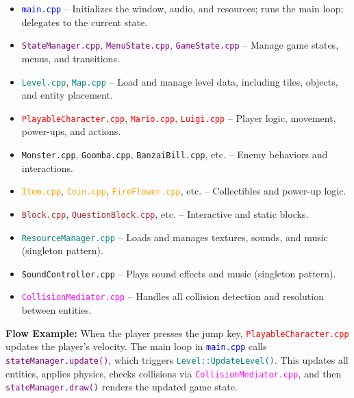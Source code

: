 \begin{flushleft}
\begin{itemize}
    \item \texttt{\textcolor{blue}{main.cpp}} – Initializes the window, audio, and resources; runs the main loop; delegates to the current state.
    \item \texttt{\textcolor{purple}{StateManager.cpp}}, \texttt{\textcolor{purple}{MenuState.cpp}}, \texttt{\textcolor{purple}{GameState.cpp}} – Manage game states, menus, and transitions.
    \item \texttt{\textcolor{teal}{Level.cpp}}, \texttt{\textcolor{teal}{Map.cpp}} – Load and manage level data, including tiles, objects, and entity placement.
    \item \texttt{\textcolor{red}{PlayableCharacter.cpp}}, \texttt{\textcolor{red}{Mario.cpp}}, \texttt{\textcolor{red}{Luigi.cpp}} – Player logic, movement, power-ups, and actions.
    \item \texttt{\textcolor{green!60!black}{Monster.cpp}}, \texttt{\textcolor{green!60!black}{Goomba.cpp}}, \texttt{\textcolor{green!60!black}{BanzaiBill.cpp}}, etc. – Enemy behaviors and interactions.
    \item \texttt{\textcolor{orange}{Item.cpp}}, \texttt{\textcolor{orange}{Coin.cpp}}, \texttt{\textcolor{orange}{FireFlower.cpp}}, etc. – Collectibles and power-up logic.
    \item \texttt{\textcolor{brown}{Block.cpp}}, \texttt{\textcolor{brown}{QuestionBlock.cpp}}, etc. – Interactive and static blocks.
    \item \texttt{\textcolor{teal}{ResourceManager.cpp}} – Loads and manages textures, sounds, and music (singleton pattern).
    \item \texttt{\textcolor{cyan!80!black}{SoundController.cpp}} – Plays sound effects and music (singleton pattern).
    \item \texttt{\textcolor{magenta}{CollisionMediator.cpp}} – Handles all collision detection and resolution between entities.
\end{itemize}

\textbf{Flow Example:} When the player presses the jump key, \texttt{\textcolor{red}{PlayableCharacter.cpp}} updates the player’s velocity. The main loop in \texttt{\textcolor{blue}{main.cpp}} calls \texttt{\textcolor{purple}{stateManager.update()}}, which triggers \texttt{\textcolor{teal}{Level::UpdateLevel()}}. This updates all entities, applies physics, checks collisions via \texttt{\textcolor{magenta}{CollisionMediator.cpp}}, and then \texttt{\textcolor{purple}{stateManager.draw()}} renders the updated game state.


\end{flushleft}
